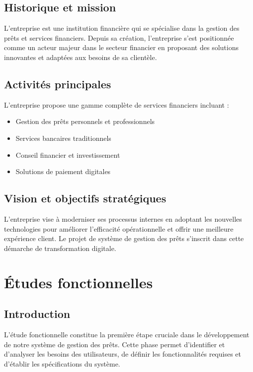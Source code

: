 \documentclass[12pt,a4paper]{report}
\begin{document}
\section*{Historique et mission}

L'entreprise est une institution financière qui se spécialise dans la gestion des prêts et services financiers. Depuis sa création, l'entreprise s'est positionnée comme un acteur majeur dans le secteur financier en proposant des solutions innovantes et adaptées aux besoins de sa clientèle.

\section*{Activités principales}

L'entreprise propose une gamme complète de services financiers incluant :
\begin{itemize}
    \item Gestion des prêts personnels et professionnels
    \item Services bancaires traditionnels
    \item Conseil financier et investissement
    \item Solutions de paiement digitales
\end{itemize}

\section*{Vision et objectifs stratégiques}

L'entreprise vise à moderniser ses processus internes en adoptant les nouvelles technologies pour améliorer l'efficacité opérationnelle et offrir une meilleure expérience client. Le projet de système de gestion des prêts s'inscrit dans cette démarche de transformation digitale.

\newpage

\chapter{Études fonctionnelles}

\section{Introduction}

L'étude fonctionnelle constitue la première étape cruciale dans le développement de notre système de gestion des prêts. Cette phase permet d'identifier et d'analyser les besoins des utilisateurs, de définir les fonctionnalités requises et d'établir les spécifications du système.
\end{document}
